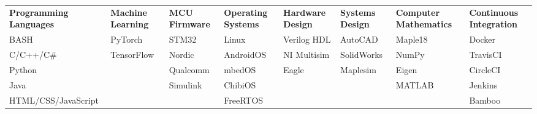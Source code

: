 
\begin{cvparagraph}

\begin{center}
  \begin{tabular}{L L L L L L L L}
  \textbf{Programming Languages} & \textbf{Machine Learning} & \textbf{MCU Firmware} & \textbf{Operating Systems} & \textbf{Hardware Design} & \textbf{Systems Design} & \textbf{Computer Mathematics} & \textbf{Continuous Integration} \\
  BASH                 & PyTorch    & STM32    & Linux     & Verilog HDL & AutoCAD    & Maple18 & Docker   \\
  C/C++/C\#            & TensorFlow & Nordic   & AndroidOS & NI Multisim & SolidWorks & NumPy   & TravisCI \\
  Python               &            & Qualcomm & mbedOS    & Eagle       & Maplesim   & Eigen   & CircleCI \\
  Java                 &            & Simulink & ChibiOS   &             &            & MATLAB  & Jenkins  \\
  HTML/CSS/JavaScript  &            &          & FreeRTOS  &             &            &         & Bamboo   \\
  \end{tabular}
\end{center}


\end{cvparagraph}
